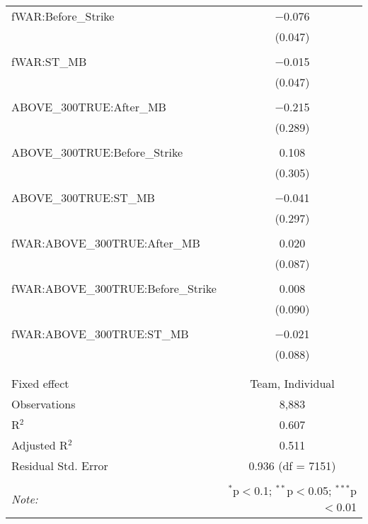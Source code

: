 \begin{table}[!htbp]
\begin{tabular}{@{\extracolsep{5pt}}lc}
 fWAR:Before\_Strike & $-$0.076 \\
  & (0.047) \\
  & \\
 fWAR:ST\_MB & $-$0.015 \\
  & (0.047) \\
  & \\
 ABOVE\_300TRUE:After\_MB & $-$0.215 \\
  & (0.289) \\
  & \\
 ABOVE\_300TRUE:Before\_Strike & 0.108 \\
  & (0.305) \\
  & \\
 ABOVE\_300TRUE:ST\_MB & $-$0.041 \\
  & (0.297) \\
  & \\
 fWAR:ABOVE\_300TRUE:After\_MB & 0.020 \\
  & (0.087) \\
  & \\
 fWAR:ABOVE\_300TRUE:Before\_Strike & 0.008 \\
  & (0.090) \\
  & \\
 fWAR:ABOVE\_300TRUE:ST\_MB & $-$0.021 \\
  & (0.088) \\
  & \\
\hline \\[-1.8ex]
Fixed effect & Team, Individual \\
Observations & 8,883 \\
R$^{2}$ & 0.607 \\
Adjusted R$^{2}$ & 0.511 \\
Residual Std. Error & 0.936 (df = 7151) \\
\hline
\hline \\[-1.8ex]
\textit{Note:}  & \multicolumn{1}{r}{$^{*}$p$<$0.1; $^{**}$p$<$0.05; $^{***}$p$<$0.01} \\
\end{tabular}
\end{table}
